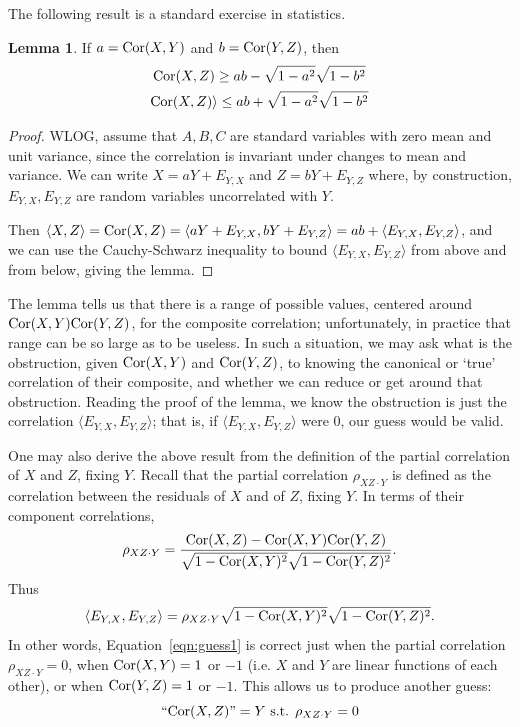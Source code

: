 \documentclass{article}
\theoremstyle{definition}
\newtheorem{lemma}[theorem]{Lemma}
\def\Cor{\textnormal{Cor}}
\begin{document}
The following result is a standard exercise in statistics.%

\begin{lemma}If $a = \Cor(X,Y)$ and $b = \Cor(Y,Z)$, then 
\begin{gather}
\Cor(X,Z) \geq ab - \sqrt{1-a^2}\sqrt{1-b^2} \\ 
\Cor(X,Z) \rangle \leq ab + \sqrt{1-a^2}\sqrt{1-b^2}
\end{gather}
\end{lemma}

\begin{proof}
WLOG, assume that $A,B,C$ are standard variables with zero mean and unit variance, since the correlation is invariant under changes to mean and variance. We can write $X = a Y + E_{Y,X}$ and $Z = b Y + E_{Y,Z}$ where, by construction, $E_{Y,X}, E_{Y,Z}$ are random variables uncorrelated with $Y$.

Then $\langle X, Z \rangle = \Cor(X,Z) = \langle aY + E_{Y,X}, bY + E_{Y,Z} \rangle = ab + \langle E_{Y,X}, E_{Y,Z} \rangle$, and we can use the Cauchy-Schwarz inequality to bound $\langle E_{Y,X}, E_{Y,Z} \rangle$ from above and from below, giving the lemma.
\end{proof}

The lemma tells us that there is a range of possible values, centered around $\Cor(X,Y)\Cor(Y,Z)$, for the composite correlation; unfortunately, in practice that range can be so large as to be useless. In such a situation, we may ask what is the obstruction, given $\Cor(X,Y)$ and $\Cor(Y,Z)$, to knowing the canonical or `true' correlation of their composite, and whether we can reduce or get around that obstruction. Reading the proof of the lemma, we know the obstruction is just the correlation $\langle E_{Y,X}, E_{Y,Z} \rangle$; that is, if $\langle E_{Y,X}, E_{Y,Z} \rangle$ were 0, our guess would be valid.

One may also derive the above result from the definition of the partial correlation of $X$ and $Z$, fixing $Y$. Recall that the partial correlation $\rho_{XZ \cdot Y}$ is defined as the correlation between the residuals of $X$ and of $Z$, fixing $Y$. In terms of their component correlations,
\[ \rho_{XZ \cdot Y} = \frac{\Cor(X,Z) - \Cor(X,Y)\Cor(Y,Z)}{\sqrt{1-\Cor(X,Y)^2}\sqrt{1-\Cor(Y,Z)^2}}. \]
Thus 
\[\langle E_{Y,X}, E_{Y,Z} \rangle = \rho_{XZ \cdot Y} \sqrt{1-\Cor(X,Y)^2}\sqrt{1-\Cor(Y,Z)^2}.\] 
In other words, Equation~\ref{eqn:guess1} is correct just when the partial correlation $\rho_{XZ\cdot Y} = 0$, when $\Cor(X,Y) = 1$ or $-1$ (i.e. $X$ and $Y$ are linear functions of each other), or when $\Cor(Y,Z) = 1$ or $-1$. This allows us to produce another guess:
\begin{equation}\label{eqn:guess2}
\text{``}\Cor(X,Z)\text{''} = Y \text{ s.t. } \rho_{XZ \cdot Y} = 0
\end{equation}
\end{document}
